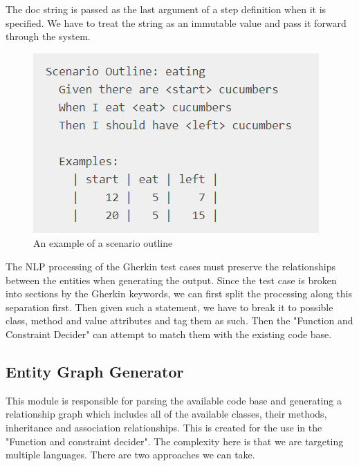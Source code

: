 \documentclass[conference]{IEEEtran}
\begin{document}
\begin{itemize}
	The doc string is passed as the last argument of a step definition when it is specified. We have to treat the string as an immutable value and pass it forward through the system.
	\begin{figure}
		\includegraphics[width=\linewidth]{Scenario_outline.png}
		\caption{An example of a scenario outline}
		\label{fig13}
	\end{figure}
\end{itemize}

The NLP processing of the Gherkin test cases must preserve the relationships between the entities when generating the output. Since the test case is broken into sections by the Gherkin keywords, we can first split the processing along this separation first. Then given such a statement, we have to break it to possible class, method and value attributes and tag them as such. Then the "Function and Constraint Decider" can attempt to match them  with the existing code base.

\subsection{Entity Graph Generator}
This module is responsible for parsing the available code base and generating a relationship graph which includes all of the available classes, their methods, inheritance and association relationships. This is created for the use in the "Function and constraint decider". The complexity here is that we are targeting multiple languages. There are two approaches we can take.
\end{document}
